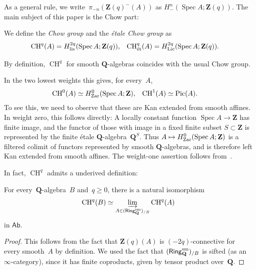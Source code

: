 \documentclass[11pt,a4paper]{amsart}
\renewcommand{\injlim}{\varinjlim}
\newcommand{\cref}[1]{\zcref{#1}}
\numberwithin{equation}{section}
\theoremstyle{plain}
\theoremstyle{definition}
\theoremstyle{remark}
\newcommand{\ZZ}{\mathbf{Z}}
\newcommand{\QQ}{\mathbf{Q}}
\newcommand{\Lic}{\textnormal{Lic}}
\newcommand{\Zar}{\textnormal{Zar}}
\newcommand{\et}{\textnormal{ét}}
\newcommand{\lis}{\textnormal{lis}}
\newcommand{\sm}{\textnormal{sm}}
\newcommand{\CH}{\operatorname{CH}}
\newcommand{\Pic}{\operatorname{Pic}}
\newcommand{\Spec}{\operatorname{Spec}}
\newcommand{\X}{\mathord{-}}
\newcommand{\Cat}[1]{\mathsf{#1}}
\begin{document}
As a general rule,
we write~\(\pi_{-n}(\ZZ(q)^{\X}(A))\)
as \(H^{n}_{\X}(\Spec A;\ZZ(q))\).
The main subject of this paper
is the Chow part:

\begin{definition}\label{xcasq8}
  We define the \emph{Chow group}
  and the \emph{étale Chow group} as
  \begin{align*}
    \CH^q(A)&=H^{2q}_{\lis}(\Spec A;\ZZ(q)),&
    \CH^q_{\et}(A)&=H^{2q}_{\Lic}(\Spec A;\ZZ(q)).
  \end{align*}
\end{definition}

\begin{example}\label{x4h978}
  By definition,
  \(\CH^{q}\)
  for smooth \(\QQ\)-algebras
  coincides with the usual Chow group.
\end{example}

\begin{example}\label{low-chow}
  In the two lowest weights this gives, for every~\(A\),
  \begin{align*}
    \CH^0(A)&\simeq H^0_{\Zar}(\Spec A;\ZZ),&
    \CH^1(A)&\simeq\Pic(A).
  \end{align*}
  To see this,
  we need to observe that
  these are Kan extended from smooth affines.
  In weight zero, this follows directly:
  A locally constant function
  \(\Spec A\to\ZZ\) has finite image,
  and the functor of those with image in a fixed finite subset
  \(S\subset\ZZ\) is represented by the finite étale
  \(\QQ\)-algebra~\(\QQ^{S}\).
  Thus \(A\mapsto H^0_{\Zar}(\Spec A;\ZZ)\)
  is a filtered colimit
  of functors represented by smooth \(\QQ\)-algebras,
  and is therefore left Kan extended
  from smooth affines.
  The weight-one assertion follows from~\cref{e:weight-one}.
\end{example}

In fact, \(\CH^{q}\) admits a underived definition:

\begin{proposition}\label{top-lan}
  For every~\(\QQ\)-algebra~\(B\) and~\(q\geq0\),
  there is a natural isomorphism
  \begin{equation*}
    \CH^{q}(B)
    \simeq
    \injlim_{A\in (\Cat{Ring}_{\QQ}^{\sm})_{/B}}\CH^{q}(A)
  \end{equation*}
  in \(\Cat{Ab}\).
\end{proposition}

\begin{proof}
  This follows from the fact
  that \(\ZZ(q)(A)\)
  is \((-2q)\)-connective for every
  smooth~\(A\) by definition.
  We used the fact that \((\Cat{Ring}_{\QQ}^{\sm})_{/B}\)
  is sifted (as an \(\infty\)-category),
  since it has finite coproducts, given by tensor product over~\(\QQ\).
\end{proof}
\end{document}
